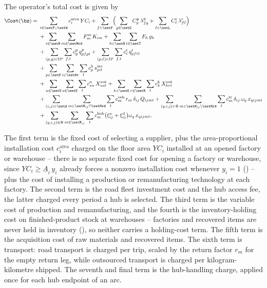 The operator's total cost is given by
\begin{align}
\Cost(\bz)
={}&
  \sum_{i\in\setF\cup\setW} c^{\mathrm{area}}_i\,YC_i
  +\sum_{f\in\setF}\Bigl(
     \sum_{g\in\setG} C^{\mathrm{p}}_g\,\lambda^{\mathrm{p}}_{fg}
    +\sum_{\ell\in\setL} C^{\mathrm{r}}_{\ell}\,\lambda^{\mathrm{r}}_{f\ell}
  \Bigr)
\nonumber\\
&+
  \sum_{i\in\setN}\sum_{m\in\setMrd}
     F^{\mathrm{m}}_m\,K_{im}
   +\sum_{h\in\setH}\sum_{t\in\setT}
     F_h\,y_h
\nonumber\\
&+
  \sum_{(p,g)\in\Omega^{\mathrm{p}}}\sum_{f,t}
     c^{\mathrm{p}}_g\,q^{\mathrm{p}}_{pfgt}
   +\sum_{(p,\ell)\in\Omega^{\mathrm{r}}}\sum_{f,t}
     c^{\mathrm{r}}_{\ell}\,q^{\mathrm{r}}_{pf\ell t}
\nonumber\\
&+
  \sum_{p\in\setP}\sum_{i\in\setNv}\sum_{t}
     c^{\mathrm{h}}_p\,s^{\mathrm{inv}}_{pit}
\nonumber\\
&+
  \sum_{u\in\setU}\sum_{s\in\setS}\sum_{t}
     c^{\mathrm{u}}_{su}\,X^{\mathrm{out}}_{ust}
   +\sum_{k\in\setK}\sum_{r\in\setR}\sum_{t}
     c^{\mathrm{k}}_k\,X^{\mathrm{out}}_{krt}
\nonumber\\
&+
  \sum_{(i,j)\in\setA}\sum_{m\in\setM_{ij}\cap\setMrd}\sum_{t}
     c^{\mathrm{veh}}_m\,r_m\,\delta_{ij}\,Q_{ijmt}
   +\sum_{(q,i,j)\in\Phi}\sum_{m\in\setM_{ij}\setminus\setMrd}\sum_{t}
     c^{\mathrm{tr}}_m\,\delta_{ij}\,\omega_q\,x_{qijmt}
\nonumber\\
&+
  \sum_{(q,i,j)\in\Phi}\sum_{m\in\setM_{ij}}\sum_{t}
     c^{\mathrm{hub}}_m
     \bigl(\xi^{\mathrm{o}}_{ij}+\xi^{\mathrm{d}}_{ij}\bigr)
     \omega_q\,x_{qijmt},
\label{eq:cost}
\end{align}

The first term is the fixed cost of selecting a supplier, plus the
area-proportional installation cost $c^{\mathrm{area}}_i$ charged on the
floor area $YC_i$ installed at an opened factory or warehouse -- there
is no separate fixed cost for opening a factory or warehouse, since
$YC_i\ge\underline{A}_i\,y_i$ already forces a nonzero installation cost
whenever $y_i=1$ () -- plus the cost of installing
a production or remanufacturing technology at each factory. The second term is the road
fleet investment cost and the hub access fee, the latter charged every
period a hub is selected. The
third term is the variable cost of production and remanufacturing, and
the fourth is the inventory-holding cost on finished-product stock at
warehouses -- factories and recovered items are never held in
inventory (), so neither carries a holding-cost
term. The fifth term is the acquisition cost of
raw materials and recovered items. The sixth term is transport: road
transport is charged per trip, scaled by the return factor $r_m$ for the
empty return leg, while outsourced transport is charged per
kilogram-kilometre shipped. The seventh and final term is the
hub-handling charge, applied once for each hub endpoint of an arc.

